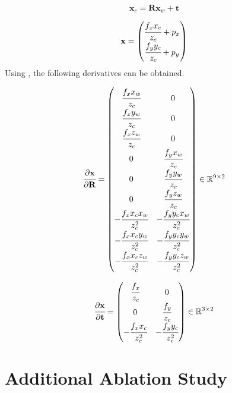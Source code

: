 \documentclass[10pt,twocolumn,letterpaper]{article}
\begin{document}
\begin{equation}
  \mathbf{x}_c = \mathbf{R} \mathbf{x}_{w} + \mathbf{t}
\label{eq:camera_projection}
\end{equation}

\begin{equation}
    \mathbf{x} = \begin{pmatrix}
                   \cfrac{f_x x_c}{z_c} + p_x \\
                   \cfrac{f_y y_c}{z_c} + p_y \\
                \end{pmatrix}
    \label{eq:image_coordinate}
\end{equation}
Using , the following derivatives can be obtained.


\begin{equation}
   \cfrac{\partial \mathbf{x}}{\partial \mathbf{R}} =
     \begin{pmatrix}
       \cfrac{f_x x_w}{z_c} & 0 \\ \cfrac{f_x y_w}{z_c} & 0 \\ \cfrac{f_x z_w}{z_c} & 0 \\
       0 & \cfrac{f_y x_w}{z_c} \\ 0 & \cfrac{f_y y_w}{z_c} \\ 0 & \cfrac{f_y z_w}{z_c} \\
       - \cfrac{f_x x_c x_w}{z_c^2} & - \cfrac{f_y y_c x_w}{z_c^2} \\
       - \cfrac{f_x x_c y_w}{z_c^2} & - \cfrac{f_y y_c y_w}{z_c^2} \\
       - \cfrac{f_x x_c z_w}{z_c^2} & - \cfrac{f_y y_c z_w}{z_c^2} \\
     \end{pmatrix} \in \mathbb{R}^{9 \times 2}
\end{equation}

\begin{equation}
   \cfrac{\partial \mathbf{x}}{\partial \mathbf{t}} =
     \begin{pmatrix}
       \cfrac{f_x}{z_c} & 0 \\
       0 & \cfrac{f_y}{z_c}  \\
       - \cfrac{f_x x_c}{z_c^2} & - \cfrac{f_y y_c}{z_c^2} \\
     \end{pmatrix} \in \mathbb{R}^{3 \times 2}
\end{equation}

\section{Additional Ablation Study}
\end{document}
